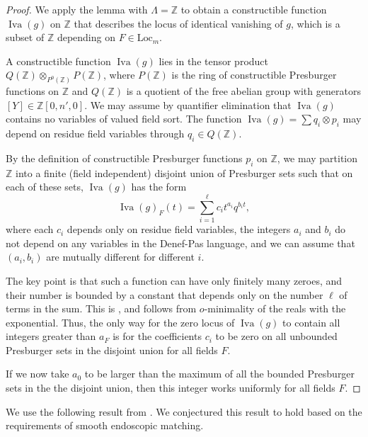 \documentclass[12pt]{amsart}
\newcommand{\op}[1]{\operatorname{#1}}
\newcommand{\ring}[1]{{\mathbb #1}}
\newcommand{\locus}[1]{\op{Iva}(#1)}
\newcommand{\Loc}{\mathrm{Loc}}
\theoremstyle{plain}
\theoremstyle{definition}
\begin{document}
\begin{proof}
We apply the lemma with $\Lambda=\ring{Z}$ to obtain a constructible
function $\locus{g}$ on $\ring{Z}$ that describes the locus of identical
vanishing of $g$, which is a subset of $\ring{Z}$ depending on $F\in\Loc_m$.

A constructible function $\locus{g}$ lies in the tensor product
$Q(\ring{Z})\otimes_{P^0(\ring{Z})} P(\ring{Z})$, where $P(\ring{Z})$
is the ring of constructible Presburger functions on $\ring{Z}$ and
$Q(\ring{Z})$ is a quotient of the free abelian group with generators
$[Y]\in \ring{Z}[0,n',0]$.  We may assume by quantifier elimination
that $\locus{g}$ contains no variables of valued field sort.  The
function $\locus{g} = \sum q_i\otimes p_i$ may depend on residue field
variables through $q_i\in Q(\ring{Z})$.

By the definition of constructible Presburger functions $p_i$ on
$\ring{Z}$, we may partition $\ring{Z}$ into a finite (field
independent) disjoint union of Presburger sets such that on each of
these sets, $\locus{g}$ has the form
\[
\locus{g}_F(t) = \sum_{i=1}^\ell c_i t^{a_i} q^{b_i t},
\]
where each $c_i$ depends only on residue field variables, the integers
$a_i$ and $b_i$ do not depend on any variables in the Denef-Pas
language, and we can assume that $(a_i,b_i)$ are mutually different
for different $i$.

The key point is that such a function can have only finitely many
zeroes, and their number is bounded by a constant that depends only on
the number $\ell$ of terms in the sum.  This is \cite[Lemma 2.1.7]{CGH1},
and follows from $o$-minimality of the reals with the exponential.
Thus, the only way for the zero locus of $\locus{g}$ to contain all integers
greater than $a_F$ is for the coefficients $c_i$ to be zero on all
unbounded Presburger sets in the disjoint union for all fields $F$.

If we now take $a_0$ to be larger than the maximum of all the bounded
Presburger sets in the the disjoint union, then this integer works
uniformly for all fields $F$.
\end{proof}



We use the following result from \cite{CGH2}.  We conjectured
this result to hold based on the 
requirements of smooth endoscopic matching.
\end{document}
